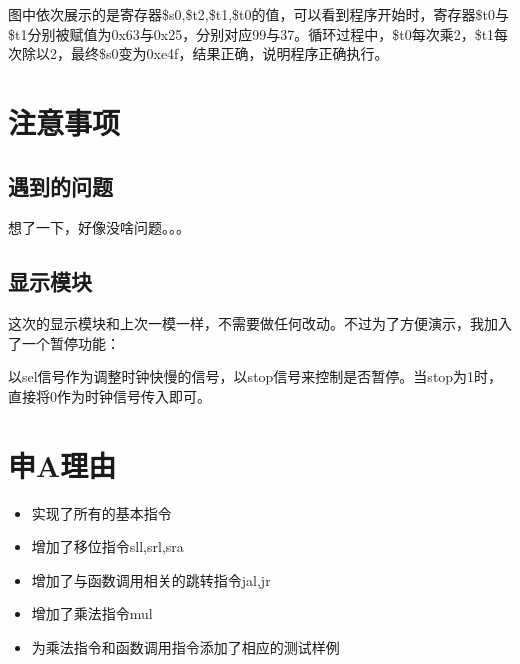 \documentclass[12pt]{article} %
\begin{document}
\begin{sloppypar}
图中依次展示的是寄存器\$s0,\$t2,\$t1,\$t0的值，可以看到程序开始时，寄存器\$t0与\$t1分别被赋值为0x63与0x25，分别对应99与37。循环过程中，\$t0每次乘2，\$t1每次除以2，最终\$s0变为0xe4f，结果正确，说明程序正确执行。



\section{注意事项}

\subsection{遇到的问题}

想了一下，好像没啥问题。。。

\subsection{显示模块}

这次的显示模块和上次一模一样，不需要做任何改动。不过为了方便演示，我加入了一个暂停功能：

以sel信号作为调整时钟快慢的信号，以stop信号来控制是否暂停。当stop为1时，直接将0作为时钟信号传入即可。

\section{申A理由}

\begin{itemize}
\item 实现了所有的基本指令
\item 增加了移位指令sll,srl,sra
\item 增加了与函数调用相关的跳转指令jal,jr
\item 增加了乘法指令mul
\item 为乘法指令和函数调用指令添加了相应的测试样例
\end{itemize}

\end{sloppypar}
\end{document}

